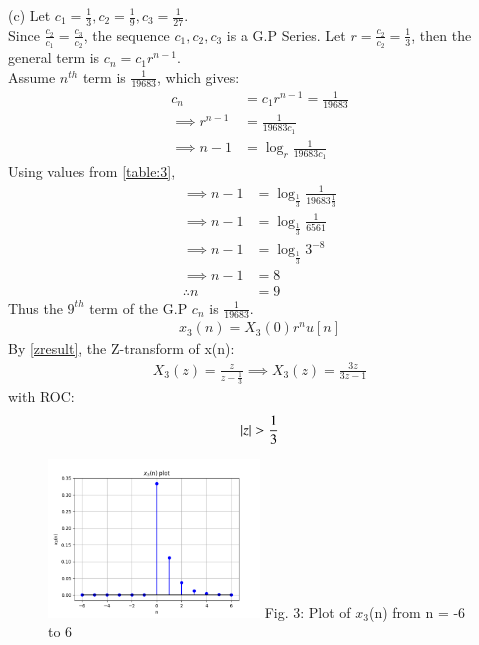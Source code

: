 \documentclass[journal,12pt,twocolumn]{IEEEtran}
\theoremstyle{remark}
\begin{document}
(c) Let $c_1 = \frac{1}{3}, c_2 = \frac{1}{9}, c_3 = \frac{1}{27}$.\\
Since $\frac{c_2}{c_1} = \frac{c_3}{c_2}$, the sequence $c_1, c_2, c_3$ is a G.P Series.
Let $r = \frac{c_2}{c_2} = \frac{1}{3}$, then the general term is $c_n = c_1 r^{n-1}$.\\
Assume $n^{th}$ term is $\frac{1}{19683}$, which gives: 
\begin{align}
    c_n &= c_1 r^{n-1} = \frac{1}{19683}\\
    \implies r^{n-1} &= \frac{1}{19683 c_1}\\
    \implies n - 1 &= \log_{r}{\frac{1}{19683 c_1}}
\end{align}
Using values from \ref{table:3},
\begin{align}
    \implies n - 1 &= \log_{\frac{1}{3}}{\frac{1}{19683 \frac{1}{3}}}\\
    \implies n - 1 &= \log_{\frac{1}{3}}{\frac{1}{6561}}\\
    \implies n - 1 &= \log_{\frac{1}{3}}{3^{-8}}\\
    \implies n - 1 &= 8\\
    \therefore n &= 9
\end{align}
Thus the $9^{th}$ term of the G.P $c_n$ is $\frac{1}{19683}$.
\begin{align}  x_3(n) = X_3(0)r^{n}u[n]  \end{align}
By \ref{zresult}, the Z-transform of x(n):
\begin{align}
    X_3(z) = \frac{z}{z - \frac{1}{3}}
    \implies X_3(z) = \frac{3z}{3z - 1}
\end{align} with ROC: \[ \left\vert z\right\vert > \frac{1}{3} \]

\begin{figure}[h!]
    \centering
    \includegraphics[width=0.5\textwidth]{figs/c.png}
    Fig. 3: Plot of $x_3$(n) from n = -6 to 6
    \label{fig:img3}
\end{figure}
\end{document}

